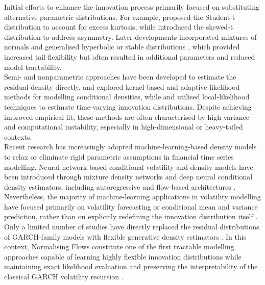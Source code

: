 \documentclass[oneside,12pt]{CUEDthesisPSnPDF}
\newcommand{\textcite}{\citet}
\newcommand{\parencite}{\citep}
\begin{document}
Initial efforts to enhance the innovation process primarily focused on substituting alternative parametric distributions. For example, \textcite{bollerslev1987conditionally} proposed the Student-t distribution to account for excess kurtosis, while \textcite{hansen1994autoregressive} introduced the skewed-t distribution to address asymmetry. Later developments incorporated mixtures of normals \parencite{hu2005semiparametric} and generalised hyperbolic or stable distributions \parencite{mcneil2000estimation,bauwens2006multivariate}, which provided increased tail flexibility but often resulted in additional parameters and reduced model tractability.\\

Semi- and nonparametric approaches have been developed to estimate the residual density directly. \textcite{engle1993measuring} and \textcite{ghysels1996filtering} explored kernel-based and adaptive likelihood methods for modelling conditional densities, while \textcite{jones2003nonparametric} and \textcite{hansen2004nonparametric} utilised local-likelihood techniques to estimate time-varying innovation distributions. Despite achieving improved empirical fit, these methods are often characterised by high variance and computational instability, especially in high-dimensional or heavy-tailed contexts.\\

Recent research has increasingly adopted machine-learning-based density models to relax or eliminate rigid parametric assumptions in financial time series modelling. Neural network-based conditional volatility and density models have been introduced through mixture density networks \parencite{bishop1994mixture} and deep neural conditional density estimators, including autoregressive and flow-based architectures \parencite{papamakarios2017masked,papamakarios2021normalizing}. Nevertheless, the majority of machine-learning applications in volatility modelling have focused primarily on volatility forecasting or conditional mean and variance prediction, rather than on explicitly redefining the innovation distribution itself \parencite{bao2017deep}. \\

Only a limited number of studies have directly replaced the residual distributions of GARCH-family models with flexible generative density estimators \parencite{seitz2022garchnf,wu2022deepgarch}. In this context, Normalising Flows constitute one of the first tractable modelling approaches capable of learning highly flexible innovation distributions while maintaining exact likelihood evaluation and preserving the interpretability of the classical GARCH volatility recursion \parencite{rezende2015variational,papamakarios2021normalizing}.\\
\end{document}
